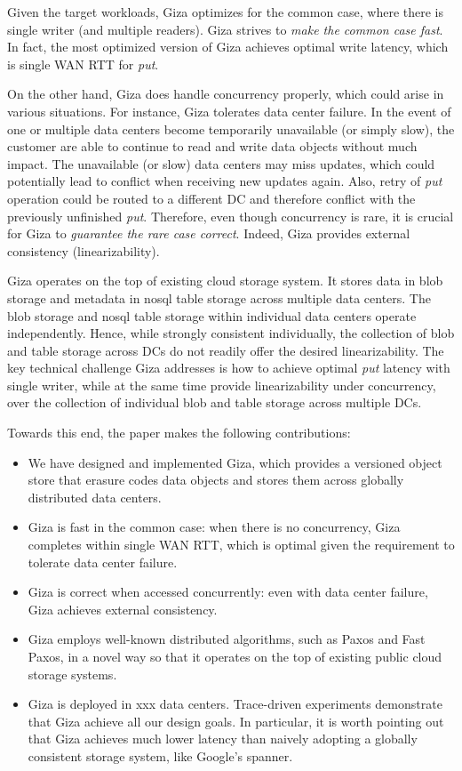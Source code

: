 Given the target workloads, Giza optimizes for the common case, where there is single writer (and multiple readers). Giza strives to {\em make the common case fast}. In fact, the most optimized version of Giza achieves optimal write latency, which is single WAN RTT for {\em put}.

On the other hand, Giza does handle concurrency properly, which could arise in various situations. For instance, Giza tolerates data center failure. In the event of one or multiple data centers become temporarily unavailable (or simply slow), the customer are able to continue to read and write data objects without much impact. The unavailable (or slow) data centers may miss updates, which could potentially lead to conflict when receiving new updates again. Also, retry of {\em put} operation could be routed to a different DC and therefore conflict with the previously unfinished {\em put}. Therefore, even though concurrency is rare, it is crucial for Giza to {\em guarantee the rare case correct}. Indeed, Giza provides external consistency (linearizability).

Giza operates on the top of existing cloud storage system. It stores data in blob storage and metadata in nosql table storage across multiple data centers. The blob storage and nosql table storage within individual data centers operate independently. Hence, while strongly consistent individually, the collection of blob and table storage across DCs do not readily offer the desired linearizability. The key technical challenge Giza addresses is how to achieve optimal {\em put} latency with single writer, while at the same time provide linearizability under concurrency, over the collection of individual blob and table storage across multiple DCs.

Towards this end, the paper makes the following contributions:
\begin{itemize}
    \item We have designed and implemented Giza, which provides a versioned object store that erasure codes data objects and stores them across globally distributed data centers.
    \item Giza is fast in the common case: when there is no concurrency, Giza completes within single WAN RTT, which is optimal given the requirement to tolerate data center failure.
    \item Giza is correct when accessed concurrently: even with data center failure, Giza achieves external consistency.
    \item Giza employs well-known distributed algorithms, such as Paxos and Fast Paxos, in a novel way so that it operates on the top of existing public cloud storage systems.
    \item Giza is deployed in xxx data centers. Trace-driven experiments demonstrate that Giza achieve all our design goals. In particular, it is worth pointing out that Giza achieves much lower latency than naively adopting a globally consistent storage system, like Google's spanner.
\end{itemize}
